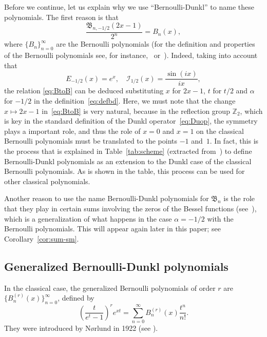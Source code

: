 \documentclass[a4paper]{amsart}
\newcommand{\Z}{\mathbb{Z}}
\newcommand{\I}{\mathcal{I}}
\newcommand{\B}{\mathfrak{B}}
\theoremstyle{plain}
\theoremstyle{definition}
\theoremstyle{remark}
\numberwithin{equation}{section}
\begin{document}
Before we continue, let us explain why we use ``Bernoulli-Dunkl'' to name these polynomials.
The first reason is that
\begin{equation}
\label{eq:BtoB}
  \frac{\B_{n,-1/2}(2x-1)}{2^n} = B_n(x),
\end{equation}
where $\{B_n\}_{n=0}^{\infty}$ are the Bernoulli polynomials (for the definition and properties of the Bernoulli polynomials see, for instance,~\cite{Dil-NIST} or~\cite{DKP}). Indeed, taking into account that
\[
  E_{-1/2}(x) = e^x,\quad \I_{1/2}(x) = \frac{\sin(ix)}{ix},
\]
the relation \eqref{eq:BtoB} can be deduced substituting $x$ for $2x-1$, $t$ for $t/2$ and $\alpha$ for $-1/2$ in the definition~\eqref{eq:defbd}. 
Here, we must note that the change $x \mapsto 2x-1$ in~\eqref{eq:BtoB} is very natural, because in the reflection group $\Z_2$, which is key in the standard definition of the Dunkl operator~\eqref{eq:Duop}, the symmetry plays a important role, and thus the role of $x=0$ and $x=1$ on the classical Bernoulli polynomials must be translated to the points $-1$ and~$1$.
In fact, this is the process that is explained in Table~\ref{tab:scheme} (extracted from~\cite{CMV}) to define Bernoulli-Dunkl polynomials as an extension to the Dunkl case of the classical Bernoulli polynomials. As is shown in the table, this process can be used for other classical polynomials.

Another reason to use the name Bernoulli-Dunkl polynomials for $\B_n$ is the role that they play in certain sums involving the zeros of the Bessel functions (see~\cite{CDPV}), which is a generalization of what happens in the case $\alpha=-1/2$ with the Bernoulli polynomials. 
This will appear again later in this paper; see Corollary~\ref{cor:sum-sm}.


\subsection{Generalized Bernoulli-Dunkl polynomials}

In the classical case, the generalized Bernoulli polynomials of order $r$ are $\{B_{n}^{(r)}(x)\}_{n=0}^\infty$, defined by
\[
  \left(\frac{t}{e^t-1}\right)^r e^{xt} 
  = \sum_{n=0}^\infty B_{n}^{(r)}(x) \frac{t^n}{n!}.
\]
They were introduced by N{\o}rlund in 1922 (see \cite{Nor, Nor-book}).
\end{document}
